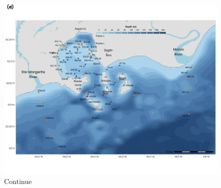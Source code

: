 \documentclass[essd, manuscript]{copernicus}
\begin{document}
\begin{figure}[!ht]
\includegraphics[width=12cm]{Figures/Fig1d.png}
\caption{Continue}
\end{figure}
\end{document}
